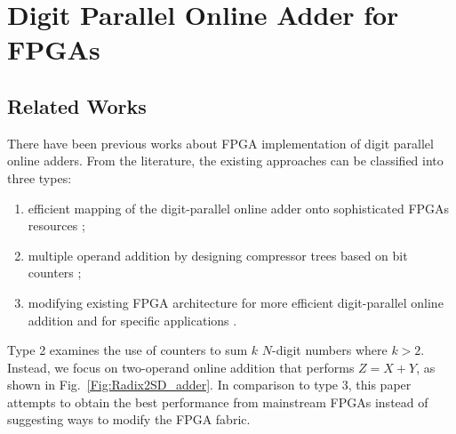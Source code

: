 \documentclass[conference]{IEEEtran}
\begin{document}
\section{Digit Parallel Online Adder for FPGAs}\label{Sec:OA_FPGA}
\subsection{Related Works}\vspace{-0.5ex}
There have been previous works about FPGA implementation of digit parallel online adders. From the literature, the existing approaches can be classified into three types:\vspace{-0.5ex}

\begin{enumerate}
    \item efficient mapping of the digit-parallel online adder onto sophisticated FPGAs resources \cite{FPT09RA,ASAP09RA};
    \item multiple operand addition by designing compressor trees based on bit counters \cite{TC13RA,CSMult_CounterArray};
    \item modifying existing FPGA architecture for more efficient digit-parallel online addition \cite{DAC07_CounterTree} and for specific applications \cite{FPL09_onlineCCM}.
\end{enumerate}

Type 2 examines the use of counters to sum $k$ $N$-digit numbers where $k>2$. Instead, we focus on two-operand online addition that performs $Z=X+Y$, as shown in Fig.~\ref{Fig:Radix2SD_adder}. In comparison to type 3, this paper attempts to obtain the best performance from mainstream FPGAs instead of suggesting ways to modify the FPGA fabric.\vspace{-0.5ex}
\end{document}
